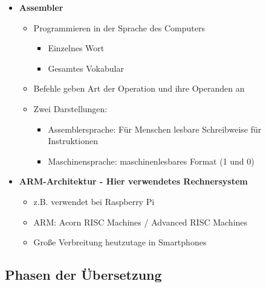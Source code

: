 \begin{itemize}
        \item \textbf{Assembler}
            \begin{itemize}
                \item Programmieren in der Sprache des Computers
                    \begin{itemize}
                        \item {} Einzelnes Wort
                        \item {} Gesamtes Vokabular
                    \end{itemize}
                \item Befehle geben Art der Operation und ihre Operanden an 
                \item Zwei Darstellungen:
                    \begin{itemize}
                        \item Assemblersprache: Für Menschen lesbare Schreibweise für Instruktionen
                        \item Maschinensprache: maschinenlesbares Format (1 und 0)
                    \end{itemize}
            \end{itemize}
        
        \item \textbf{ARM-Architektur - Hier verwendetes Rechnersystem}
            \begin{itemize}
                \item z.B. verwendet bei Raspberry Pi 
                \item ARM: Acorn RISC Machines / Advanced RISC Machines 
                \item Große Verbreitung heutzutage in Smartphones
            \end{itemize}

    \end{itemize}



\subsection{Phasen der Übersetzung}

